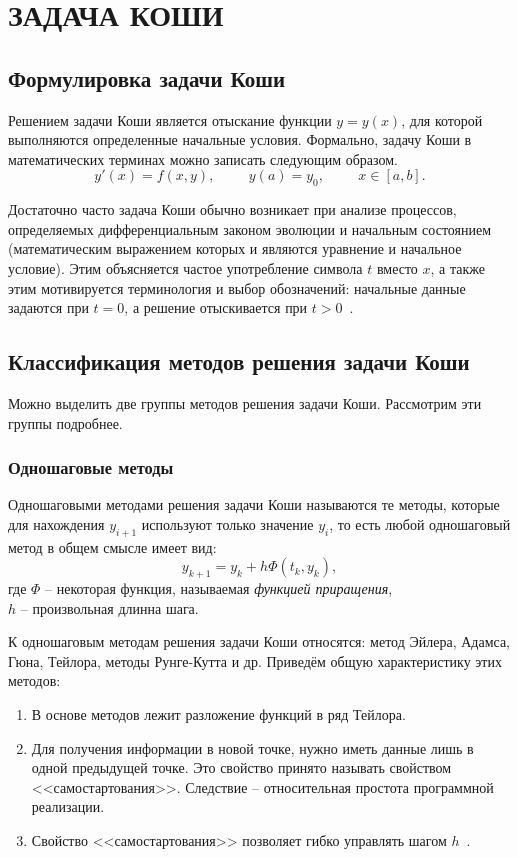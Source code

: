 \section[Задача Коши]
{ЗАДАЧА КОШИ}

\subsection{Формулировка задачи Коши}

Решением задачи Коши является отыскание функции $y = y(x)$,
для которой выполняются определенные начальные условия.
Формально, задачу Коши в математических терминах можно записать
следующим образом.
$$
    y'(x) = f(x, y), \hspace{1cm} y (a) = y_0, \hspace{1cm} x \in [a, b].
$$

Достаточно часто задача Коши обычно возникает при анализе процессов,
определяемых дифференциальным законом эволюции и начальным состоянием
(математическим выражением которых и являются уравнение и начальное условие).
Этим объясняется частое употребление символа $t$ вместо $x$, а также этим мотивируется
терминология и выбор обозначений: начальные данные задаются при $t = 0$,
а решение отыскивается при $t > 0$~\cite{numerical_intro, numerical_volkov}.


\subsection{Классификация методов решения задачи Коши}

Можно выделить две группы методов решения задачи Коши. Рассмотрим эти
группы подробнее.


\subsubsection{Одношаговые методы}

Одношаговыми методами решения задачи Коши называются те методы, которые для
нахождения $y_{i+1}$ используют только значение $y_i$, то есть любой одношаговый
метод в общем смысле имеет вид:
$$
    y_{k+1} = y_k + h\Phi(t_k, y_k),
$$
где $\Phi$ -- некоторая функция, называемая \textit{функцией приращения}, \\
$h$ -- произвольная длинна шага.

К одношаговым методам решения задачи Коши относятся: метод Эйлера, Адамса, Гюна, Тейлора,
методы Рунге-Кутта и др. Приведём общую характеристику этих методов:
\begin{enumerate}
  \item В основе методов лежит разложение функций в ряд Тейлора.
  \item Для получения информации в новой точке, нужно иметь данные лишь в одной
    предыдущей точке. Это свойство принято называть свойством <<самостартования>>.
    Следствие -- относительная простота программной реализации.
  \item Свойство <<самостартования>> позволяет гибко управлять шагом $h$~\cite{numerical_matlab}.
\end{enumerate}

